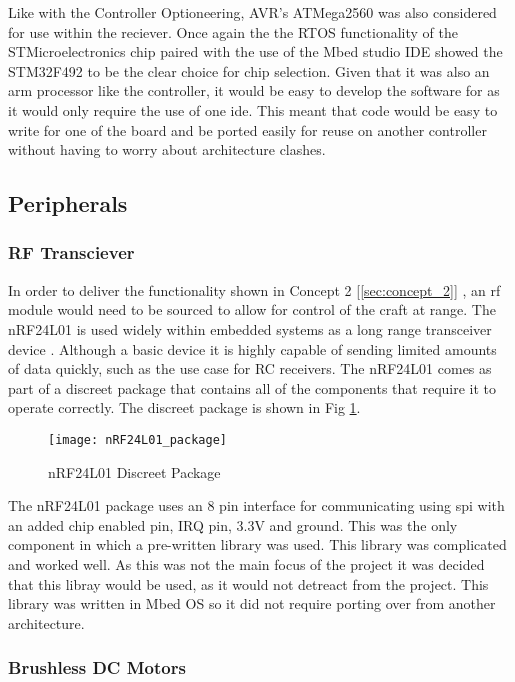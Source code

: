 \documentclass [11pt]{article}
\begin{document}
Like with the Controller Optioneering, AVR's ATMega2560 was also considered for use within the reciever. Once again the the RTOS functionality of the STMicroelectronics  chip paired with the use of the Mbed studio IDE showed the STM32F492 to be the clear choice for chip selection. Given that it was also an \gls{arm} processor like the controller, it would be easy to develop the software for as it would only require the use of one \gls{ide}. This meant that code would be easy to write for one of the board and be ported easily for reuse on another controller without having to worry about architecture clashes.       

\subsection{Peripherals}
\subsubsection{RF Transciever}

In order to deliver the functionality shown in Concept 2 [\ref{sec:concept_2}] , an \gls{rf} module would need to be sourced to allow for control of the craft at range. The nRF24L01 is used widely within embedded systems as a long range transceiver device \cite{nRF24L01}. Although a basic device it is highly capable of sending limited amounts of data quickly, such as the use case for RC receivers. The nRF24L01 comes as part of a discreet package that contains all of the components that require it to operate correctly. The discreet package is shown in Fig \ref{fig:nRF24L01_package}.

\begin{figure}[H]
\centerline{\texttt{[image: nRF24L01\_package]}}
\caption{nRF24L01 Discreet Package}
\label{fig:nRF24L01_package}
\end{figure}

The nRF24L01 package uses an 8 pin interface for communicating using \gls{spi} with an added chip enabled pin, IRQ pin, 3.3V and ground. This was the only component in which a pre-written library was used. This library was complicated and worked well. As this was not the main focus of the project it was decided that this libray would be used, as it would not detreact from the project. This library was written in Mbed OS so it did not require porting over from another architecture.  

\subsubsection{Brushless DC Motors}
\end{document}
